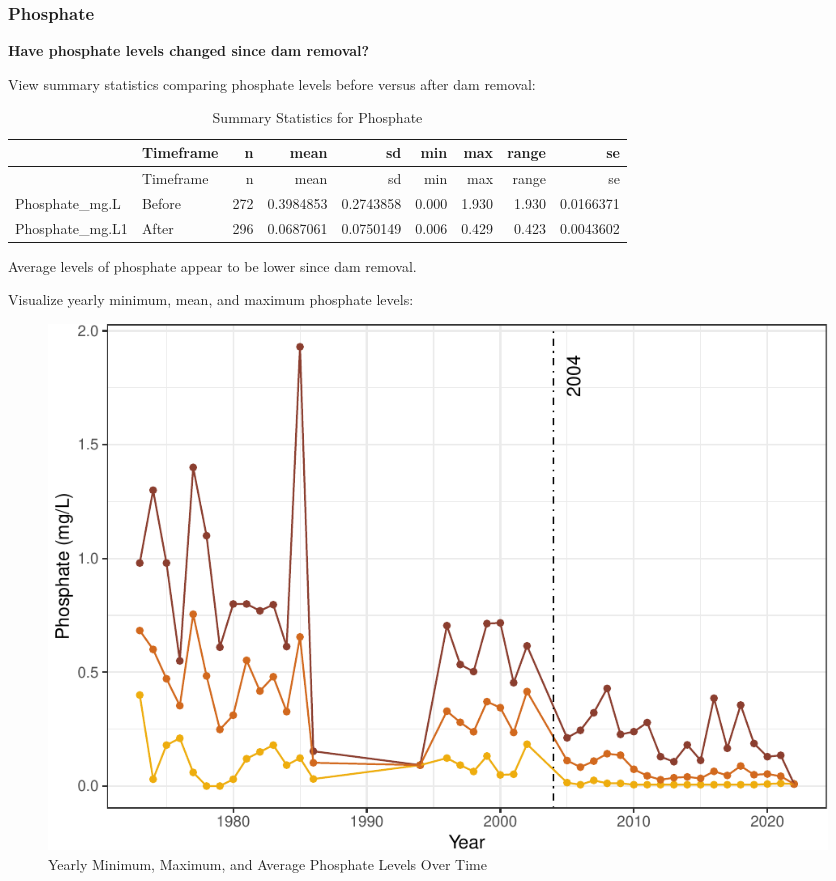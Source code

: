 \documentclass[
  12pt,
]{article}
\begin{document}
\newpage

\hypertarget{phosphate}{%
\subsubsection{Phosphate}\label{phosphate}}

\textbf{Have phosphate levels changed since dam removal?}

View summary statistics comparing phosphate levels before versus after
dam removal:

\begin{longtable}[]{@{}llrrrrrrr@{}}
\caption{Summary Statistics for Phosphate}\tabularnewline
\toprule
& Timeframe & n & mean & sd & min & max & range & se \\
\midrule
\endfirsthead
\toprule
& Timeframe & n & mean & sd & min & max & range & se \\
\midrule
\endhead
Phosphate\_mg.L & Before & 272 & 0.3984853 & 0.2743858 & 0.000 & 1.930 &
1.930 & 0.0166371 \\
Phosphate\_mg.L1 & After & 296 & 0.0687061 & 0.0750149 & 0.006 & 0.429 &
0.423 & 0.0043602 \\
\bottomrule
\end{longtable}

Average levels of phosphate appear to be lower since dam removal.

Visualize yearly minimum, mean, and maximum phosphate levels:

\begin{figure}
\centering
\includegraphics{Project_Script_files/figure-latex/Phosphate_Analysis3-1.pdf}
\caption{Yearly Minimum, Maximum, and Average Phosphate Levels Over
Time}
\end{figure}
\end{document}
